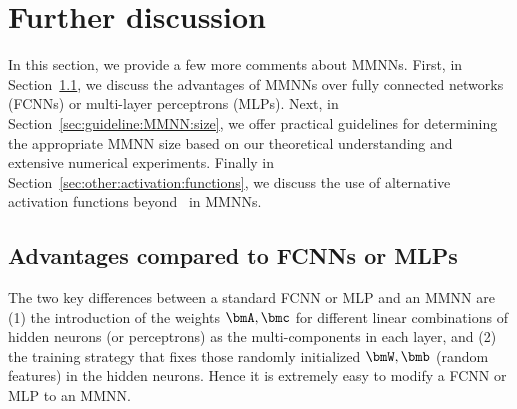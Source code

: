 \documentclass[review,hidelinks,onefignum,onetabnum]{siamart250211}
\begin{document}
    
    



\section{Further discussion}
\label{sec:further:discussion}

In this section, we provide a few more comments about MMNNs. First, in Section~\ref{sec:advantages:MMNN:vs:FCNN}, we discuss the advantages of MMNNs over fully connected networks (FCNNs) or multi-layer perceptrons (MLPs). Next, in Section~\ref{sec:guideline:MMNN:size}, we offer practical guidelines for determining the appropriate MMNN size based on our theoretical understanding and extensive numerical experiments. Finally in Section~\ref{sec:other:activation:functions}, we discuss the use of alternative activation functions beyond \ReLU\ in MMNNs.


\subsection{Advantages compared to FCNNs or MLPs}
\label{sec:advantages:MMNN:vs:FCNN}

The two key differences between a standard FCNN or MLP  and an MMNN are (1) the introduction of the weights $\bmA, \bmc$ for different linear combinations of hidden neurons (or perceptrons) as the multi-components in each layer, and (2) the training strategy that fixes those randomly initialized $\bmW,\bmb$ (random features) in the hidden neurons. Hence it is extremely easy to modify a FCNN or MLP to an MMNN. 
\end{document}
